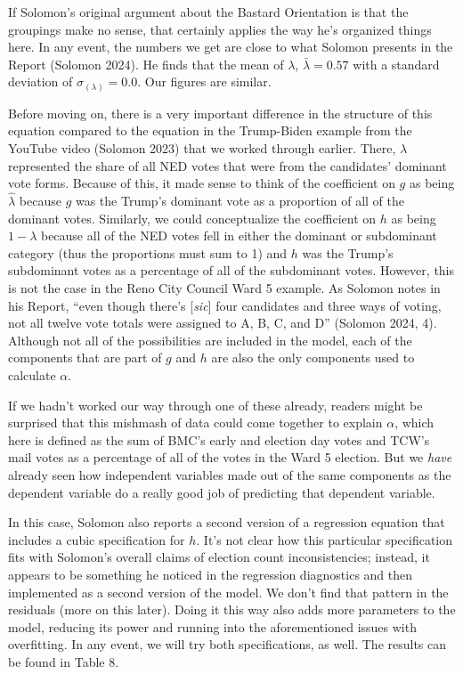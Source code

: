 \documentclass[12pt]{article}
\begin{document}
If Solomon's original argument about the Bastard Orientation is that the groupings make no sense, that certainly applies the way he's organized things here. In any event, the numbers we get are close to what Solomon presents in the Report (Solomon 2024). He finds that the mean of \(\lambda\), \(\bar{\lambda} = 0.57\) with a standard deviation of \(\sigma_{(\lambda)}= 0.0\). Our figures are similar.

Before moving on, there is a very important difference in the structure of this equation compared to the equation in the Trump-Biden example from the YouTube video (Solomon 2023) that we worked through earlier. There, \(\lambda\) represented the share of all NED votes that were from the candidates' dominant vote forms. Because of this, it made sense to think of the coefficient on \(g\) as being \(\hat{\lambda}\) because \(g\) was the Trump's dominant vote as a proportion of all of the dominant votes. Similarly, we could conceptualize the coefficient on \(h\) as being \(1-\lambda\) because all of the NED votes fell in either the dominant or subdominant category (thus the proportions must sum to 1) and \(h\) was the Trump's subdominant votes as a percentage of all of the subdominant votes. However, this is not the case in the Reno City Council Ward 5 example. As Solomon notes in his Report, ``even though there's {[}\emph{sic}{]} four candidates and three ways of voting, not all twelve vote totals were assigned to A, B, C, and D'' (Solomon 2024, 4). Although not all of the possibilities are included in the model, each of the components that are part of \(g\) and \(h\) are also the only components used to calculate \(\alpha\).

If we hadn't worked our way through one of these already, readers might be surprised that this mishmash of data could come together to explain \(\alpha\), which here is defined as the sum of BMC's early and election day votes and TCW's mail votes as a percentage of all of the votes in the Ward 5 election. But we \emph{have} already seen how independent variables made out of the same components as the dependent variable do a really good job of predicting that dependent variable.

In this case, Solomon also reports a second version of a regression equation that includes a cubic specification for \(h\). It's not clear how this particular specification fits with Solomon's overall claims of election count inconsistencies; instead, it appears to be something he noticed in the regression diagnostics and then implemented as a second version of the model. We don't find that pattern in the residuals (more on this later). Doing it this way also adds more parameters to the model, reducing its power and running into the aforementioned issues with overfitting. In any event, we will try both specifications, as well. The results can be found in Table 8.
\end{document}
